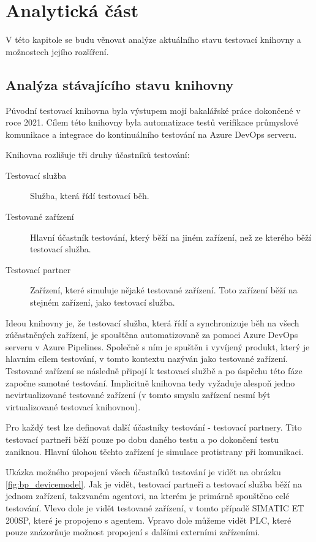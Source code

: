 \chapter{Analytická část}\label{chap:anal}

V této kapitole se budu věnovat analýze aktuálního stavu testovací knihovny a možnostech jejího rozšíření.


\section{Analýza stávajícího stavu knihovny}

Původní testovací knihovna byla výstupem mojí bakalářské práce\cite{bakalarka} dokončené v roce 2021. Cílem této knihovny byla automatizace testů verifikace průmyslové komunikace a integrace do kontinuálního testování na Azure DevOps serveru. 

Knihovna rozlišuje tři druhy účastníků testování:

\begin{description}
    \item[Testovací služba] Služba, která řídí testovací běh.
    \item[Testované zařízení] Hlavní účastník testování, který běží na jiném zařízení, než ze kterého běží testovací služba. 
    \item[Testovací partner] Zařízení, které simuluje nějaké testované zařízení. Toto zařízení běží na stejném zařízení, jako testovací služba. 
\end{description}

Ideou knihovny je, že testovací služba, která řídí a synchronizuje běh na všech zúčastněných zařízení, je spouštěna automatizovaně za pomoci Azure DevOps serveru v Azure Pipelines. Společně s ním je spuštěn i vyvíjený produkt, který je hlavním cílem testování, v tomto kontextu nazýván jako testované zařízení. Testované zařízení se následně připojí k testovací službě a po úspěchu této fáze započne samotné testování. Implicitně knihovna tedy vyžaduje alespoň jedno nevirtualizované testované zařízení (v tomto smyslu zařízení nesmí být virtualizované testovací knihovnou). 

Pro každý test lze definovat další účastníky testování - testovací partnery. Tito testovací partneři běží pouze po dobu daného testu a po dokončení testu zaniknou. Hlavní úlohou těchto zařízení je simulace protistrany při komunikaci. 

Ukázka možného propojení všech účastníků testování je vidět na obrázku \ref{fig:bp_devicemodel}. Jak je vidět, testovací partneři a testovací služba běží na jednom zařízení, takzvaném agentovi, na kterém je primárně spouštěno celé testování. Vlevo dole je vidět testované zařízení, v tomto případě SIMATIC ET 200SP, které je propojeno s agentem. Vpravo dole můžeme vidět PLC, které pouze znázorňuje možnost propojení s dalšími externími zařízeními.

